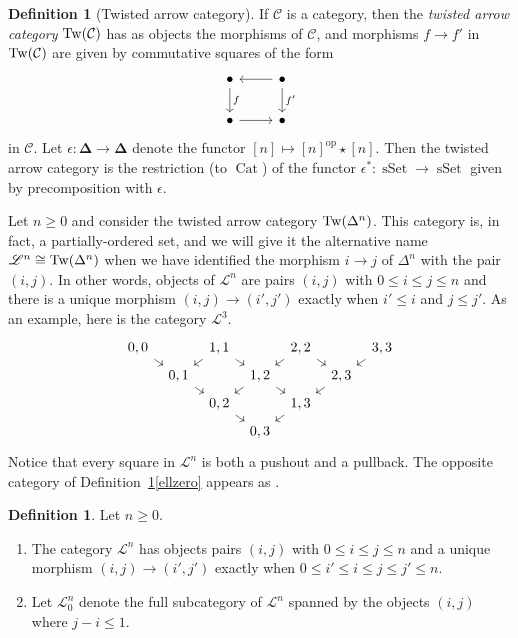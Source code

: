 \documentclass{amsart}
\numberwithin{theorem}{subsection}
\theoremstyle{definition}
\newtheorem{definition}[theorem]{Definition}
\providecommand{\op}{\mathrm{op}}
\newcommand{\xCat}{\operatorname{Cat}}
\newcommand{\xsSet}{\operatorname{sSet}}
\newcommand{\xcc}{\mathcal{C}}
\newcommand{\name}[1]{\ensuremath{\text{\textup{#1}}}}
\newcommand{\simp}{\mathbf{\Delta}}
\newcommand{\scriptyell}{\mathscr L}
\begin{document}
\begin{definition}[Twisted arrow category]
\label{def twisted arrow}
If $\xcc$ is a category, then the \emph{twisted arrow category}
	$\name{Tw}(\xcc)$ has as objects the morphisms of $\xcc$, and morphisms $f \to f'$ in $\name{Tw}(\xcc)$ are given by commutative squares of the form
	\[
		\begin{tikzcd}
			\bullet \dar{f} & \bullet \lar \dar{f'} \\
			\bullet \rar & \bullet
		\end{tikzcd}
	\]
	in $\xcc$.
	Let $\epsilon\colon \simp\to \simp$ denote the functor $[n]\mapsto [n]^\op \star [n]$.
	Then the twisted arrow category is the restriction (to $\xCat$) of the functor $\epsilon^*\colon \xsSet\to \xsSet$ given by precomposition with $\epsilon$.
\end{definition}

Let $n\geq 0$ and consider the twisted arrow category $\name{Tw}(\Delta^n)$.
This category is, in fact, a partially-ordered set, and we will give it the alternative name $\scriptyell^{n} \cong \name{Tw}(\Delta^n)$ when we have identified the morphism $i \to j$ of $\Delta^n$ with the pair $(i,j)$.
In other words, objects of $\scriptyell^{n}$ are pairs $(i,j)$ with $0\leq i \leq j \leq n$ and there is a unique morphism $(i,j) \to (i',j')$ exactly when $i' \leq i$ and $j \leq j'$.
As an example, here is the category $\scriptyell^3$.
\[ \begin{tikzcd}[column sep=tiny, row sep=tiny]
0,0 \arrow[dr] & & 1,1 \arrow[dr]\arrow[dl] & & 2, 2 \arrow[dr]\arrow[dl] & & 3,3 \arrow[dl] \\
& 0,1 \arrow[dr]& &  1,2  \arrow[dr]\arrow[dl] & & 2,3\arrow[dl] \\
& & 0,2\arrow[dr] & & 1,3\arrow[dl] \\
& & & 0,3
\end{tikzcd} \]
Notice that every square in $\scriptyell^{n}$ is both a pushout and a pullback.
The opposite category of Definition~\ref{def twnzero}\eqref{ellzero} appears as \cite[Definition 2.2.7]{HaugsengSS}.
\begin{definition}\label{def twnzero}
Let $n\geq 0$.
\begin{enumerate}
	\item The category $\scriptyell^{n}$ has objects pairs $(i,j)$ with $0\leq i \leq j \leq n$ and a unique morphism $(i,j) \to (i',j')$ exactly when $0 \leq i' \leq i \leq j \leq j' \leq n$.
	\item Let $\scriptyell_0^n$ denote the full subcategory of $\scriptyell^n$ spanned by the objects $(i,j)$ where $j-i\leq 1$. \label{ellzero}
\end{enumerate}
\end{definition}
\end{document}
